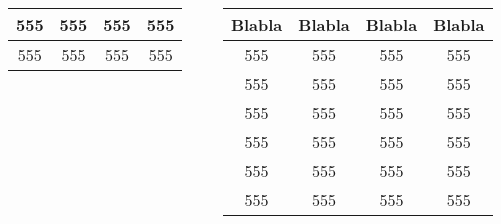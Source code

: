 \documentclass{beamer}
\begin{document}
\begin{frame}
\begin{columns}[onlytextwidth]
\begin{column}{.48\textwidth}
\begin{tabular}{|c|c|c|c|}
            555                        & 555                        & 555                        & 555                        \\ \hline
            555                        & 555 & 555                        & 555                        \\ \hline
        \end{tabular}
    \end{column}
    \begin{column}{.48\textwidth}
      \begin{tabular}{|c|c|c|c|}
            \hline
            \textbf{Blabla}       & \textbf{Blabla}             & \textbf{Blabla}          & \textbf{Blabla}          \\ \hline
            555 & 555 & 555 & 555 \\ \hline
            555 & 555 & 555 & 555 \\ \hline
            555                        & 555                        & 555                        & 555                        \\ \hline
            555                        & 555                        & 555                        & 555                        \\ \hline
            555                        & 555                        & 555                        & 555                        \\ \hline
            555                        & 555 & 555                        & 555                        \\ \hline
        \end{tabular}
    \end{column}    
\end{columns}

\end{frame}
\end{document}
